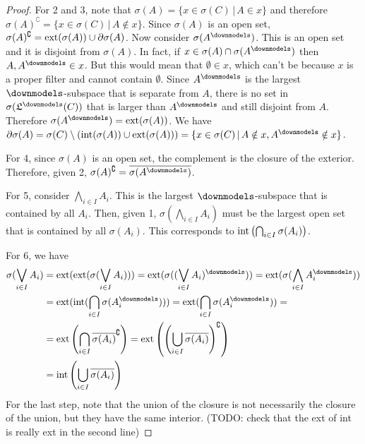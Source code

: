 \begin{mathSection}
\begin{proof}
	For 2 and 3, note that $\sigma(A) = \{ x \in \sigma(C) \, | \, A \in x \}$ and therefore $\sigma(A)^{\complement} = \{ x \in \sigma(C) \, | \, A \notin x \}$. Since $\sigma(A)$ is an open set, $\sigma(A)^{\complement} = \operatorname{ext}(\sigma(A)) \cup \partial \sigma(A)$. Now consider $\sigma(A^{\separate})$. This is an open set and it is disjoint from $\sigma(A)$. In fact, if $x \in \sigma(A) \cap \sigma(A^{\separate})$ then $A, A^{\separate} \in x$. But this would mean that $\emptyset \in x$, which can't be because $x$ is a proper filter and cannot contain $\emptyset$. Since $A^{\separate}$ is the largest $\separate$-subspace that is separate from $A$, there is no set in $\sigma(\mathfrak{L}^\separate(C))$ that is larger than $A^{\separate}$ and still disjoint from $A$. Therefore $\sigma(A^{\separate}) = \exterior(\sigma(A))$. We have $\partial \sigma(A) = \sigma(C) \setminus (\interior(\sigma(A))\cup\exterior(\sigma(A))) = \{ x \in \sigma(C) \, | \, A \notin x, A^{\separate} \notin x \}$.
	
	For 4, since $\sigma(A)$ is an open set, the complement is the closure of the exterior. Therefore, given 2, $\sigma(A)^{\complement} = \overline{\sigma(A^{\separate})}$.
	
	For 5, consider $\bigwedge_{i \in I} A_i$. This is the largest $\separate$-subspace that is contained by all $A_i$. Then, given 1, $\sigma\left(\bigwedge_{i \in I} A_i\right)$ must be the largest open set that is contained by all $\sigma(A_i)$. This corresponds to $\operatorname{int}\left(\bigcap_{i \in I} \sigma(A_i)\right)$.
	
	For 6, we have
	\begin{align*}
		\sigma(\bigvee_{i \in I} A_i) &= \exterior(\exterior(\sigma(\bigvee_{i \in I} A_i))) = \exterior(\sigma((\bigvee_{i \in I} A_i)^{\separate})) = \exterior(\sigma(\bigwedge_{i \in I} A_i^{\separate})) \\
		&= \exterior(\interior(\bigcap_{i \in I} \sigma(A_i^{\separate}))) = \exterior(\bigcap_{i \in I} \sigma(A_i^{\separate})) =  \\
		&= \exterior\left(\bigcap_{i \in I}\overline{\sigma(A_i)}^{\complement}\right) = \exterior\left(\left(\bigcup_{i \in I}\overline{\sigma(A_i)}\right)^{\complement}\right) \\
		&= \interior\left(\bigcup_{i \in I}\overline{\sigma(A_i)}\right)
	\end{align*}
	For the last step, note that the union of the closure is not necessarily the closure of the union, but they have the same interior. (TODO: check that the ext of int is really ext in the second line)
	

\end{proof}
\end{mathSection}

